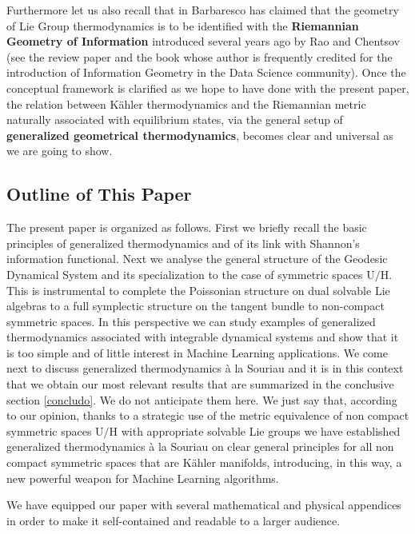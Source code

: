 \documentclass[10pt,a4paper]{article}
\begin{document}
\par
Furthermore let us also recall that in \cite{caldobarbaresco} Barbaresco has claimed that the geometry of Lie Group thermodynamics is to be identified with the \textbf{Riemannian Geometry of Information} introduced several years ago by  Rao \cite{raone} and Chentsov \cite{cenzone} (see the review paper \cite{Nielsen_2020} and the book \cite{amarone} whose author is frequently credited for the introduction of Information Geometry in the Data Science community). Once the conceptual framework is clarified as we hope to have done with the present paper, the relation between K\"ahler thermodynamics and the Riemannian metric naturally associated with equilibrium states, via the general setup of \textbf{generalized geometrical thermodynamics}, becomes clear and universal as we are going to show.
\subsection{Outline of  This Paper}
The present paper is organized as follows.    First we briefly recall the basic principles of generalized thermodynamics and of its link with  Shannon's information functional. Next we analyse the general structure of the Geodesic Dynamical System and its specialization to the case of symmetric spaces $\mathrm{U/H}$. This is instrumental to complete the Poissonian structure on dual solvable Lie algebras to a full symplectic structure on the tangent bundle to non-compact symmetric spaces. In this perspective we can study examples of generalized thermodynamics associated with integrable dynamical systems and show that it is too simple and of little interest in Machine Learning applications. We come next to discuss generalized thermodynamics {\`a} la Souriau and it is in this context that we obtain our most relevant results that are summarized in the conclusive section \ref{concludo}. We do not anticipate them here. We just say that, according to our opinion, thanks to a strategic use of the metric equivalence of non compact symmetric spaces $\mathrm{U/H}$ with appropriate solvable Lie groups we have established generalized thermodynamics
{\`a} la Souriau on clear general principles for all non compact symmetric spaces that are K\"ahler manifolds, introducing, in this way, a new powerful weapon for Machine Learning algorithms.
\par
We have equipped our paper with several mathematical and physical appendices in order to make it self-contained and readable to a larger audience.
\end{document}
